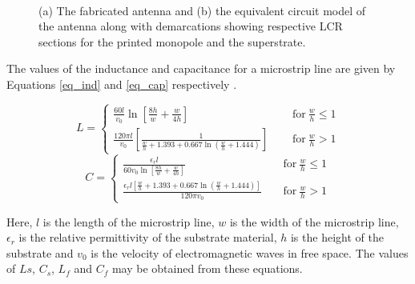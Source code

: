 \begin{figure}
\centering
{}~~~~
\caption{(a) The fabricated antenna and (b) the equivalent circuit model of the antenna along with demarcations showing respective LCR sections for the printed monopole and the superstrate.}\label{FabEqckt}
\end{figure}

The values of the inductance and capacitance for a microstrip line are given by Equations \ref{eq_ind} and \ref{eq_cap} respectively \cite{multi_conductor_analysis_book}.

\begin{equation}\label{eq_ind}
L=
    \begin{cases}
    \frac{60l}{v_0}\ln\left[\frac{8h}{w}+\frac{w}{4h}\right]~~~~~~&\text{for}~\frac{w}{h}\leq1 \\
    \frac{120\pi l}{v_0}\left[\frac{1}{\frac{w}{h}+1.393+0.667\ln \left(\frac{w}{h}+1.444\right)}\right]~~~~~~&\text{for}~\frac{w}{h}>1
    \end{cases}
\end{equation}
\begin{equation}\label{eq_cap}
C=
\begin{cases}
    \frac{\epsilon_r l}{60v_0\ln\left[\frac{8h}{w}+\frac{w}{4h}\right]}~~~~~&\text{for}~\frac{w}{h}\leq1 \\
    \frac{\epsilon_r l\left[\frac{w}{h}+1.393+0.667 \ln\left(\frac{w}{h}+1.444\right)\right]}{120\pi v_0}~~~~~&\text{for}~\frac{w}{h}>1
\end{cases}
\end{equation}

Here, $l$ is the length of the microstrip line, $w$ is the width of the microstrip line, $\epsilon_r$ is the relative permittivity of the substrate material, $h$ is the height of the substrate and $v_0$ is the velocity of electromagnetic waves in free space. The values of $Ls$, $C_s$, $L_f$ and $C_f$ may be obtained from these equations.

